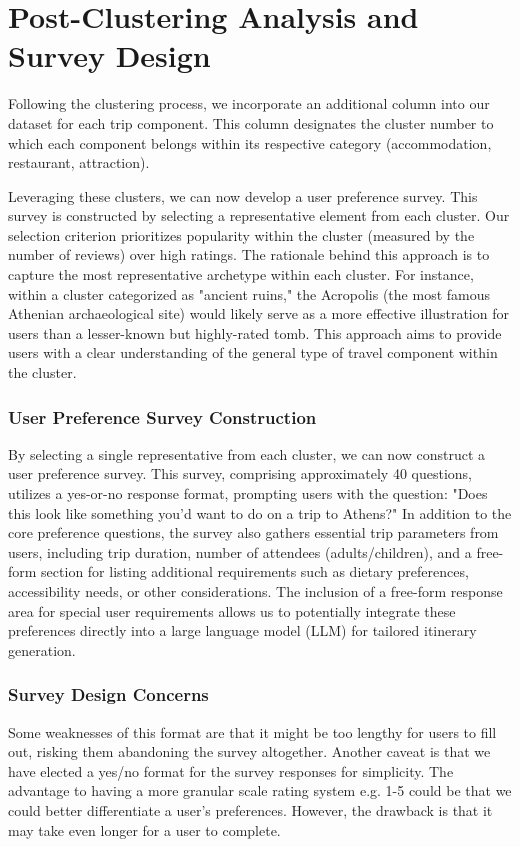 \documentclass[12pt,a4paper]{report}
\begin{document}
\section{Post-Clustering Analysis and Survey Design}

Following the clustering process, we incorporate an additional column into our dataset for each trip component.  This column designates the cluster number to which each component belongs within its respective category (accommodation, restaurant, attraction).

Leveraging these clusters, we can now develop a user preference survey.  This survey is constructed by selecting a representative element from each cluster.  Our selection criterion prioritizes popularity within the cluster (measured by the number of reviews) over high ratings.  The rationale behind this approach is to capture the most representative archetype within each cluster.  For instance, within a cluster categorized as "ancient ruins," the Acropolis (the most famous Athenian archaeological site) would likely serve as a more effective illustration for users than a lesser-known but highly-rated tomb.  This approach aims to provide users with a clear understanding of the general type of travel component within the cluster.

\subsubsection{User Preference Survey Construction}
By selecting a single representative from each cluster, we can now construct a user preference survey.  This survey, comprising approximately 40 questions, utilizes a yes-or-no response format, prompting users with the question: "Does this look like something you'd want to do on a trip to Athens?"
In addition to the core preference questions, the survey also gathers essential trip parameters from users, including trip duration, number of attendees (adults/children), and a free-form section for listing additional requirements such as dietary preferences, accessibility needs, or other considerations.  The inclusion of a free-form response area for special user requirements allows us to potentially integrate these preferences directly into a large language model (LLM) for tailored itinerary generation.

\subsubsection{Survey Design Concerns}
Some weaknesses of this format are that it might be too lengthy for users to fill out, risking them abandoning the survey altogether. Another caveat is that we have elected a yes/no format for the survey responses for simplicity. The advantage to having a more granular scale rating system e.g. 1-5 could be that we could better differentiate a user's preferences. However, the drawback is that it may take even longer for a user to complete. 
\end{document}
